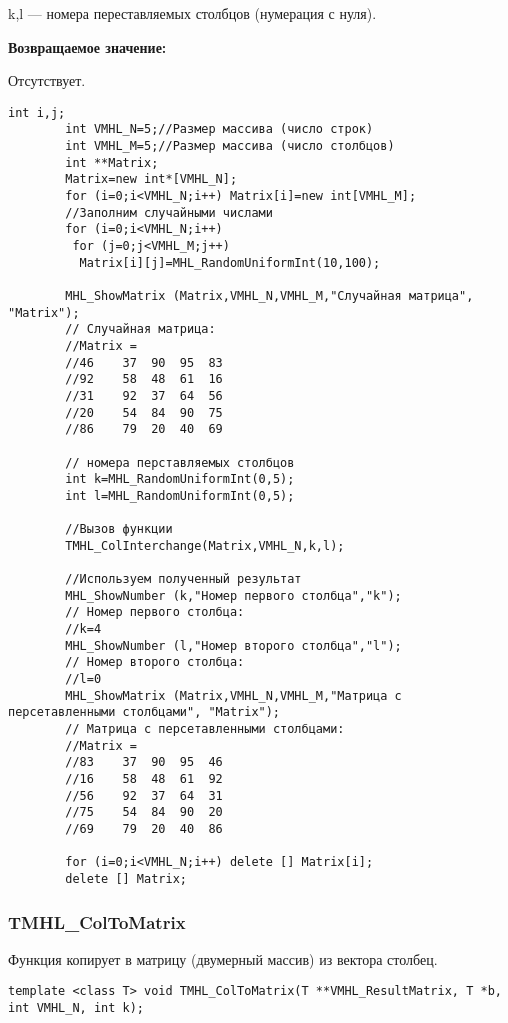 \documentclass[a4paper,12pt]{article}
\begin{document}
k,l --- номера переставляемых столбцов (нумерация с нуля).

\textbf{Возвращаемое значение:}

Отсутствует.


\begin{lstlisting}[label=code_use_TMHL_ColInterchange,caption=Пример использования]
        int i,j;
        int VMHL_N=5;//Размер массива (число строк)
        int VMHL_M=5;//Размер массива (число столбцов)
        int **Matrix;
        Matrix=new int*[VMHL_N];
        for (i=0;i<VMHL_N;i++) Matrix[i]=new int[VMHL_M];
        //Заполним случайными числами
        for (i=0;i<VMHL_N;i++)
         for (j=0;j<VMHL_M;j++)
          Matrix[i][j]=MHL_RandomUniformInt(10,100);

        MHL_ShowMatrix (Matrix,VMHL_N,VMHL_M,"Случайная матрица", "Matrix");
        // Случайная матрица:
        //Matrix =	
        //46	37	90	95	83
        //92	58	48	61	16
        //31	92	37	64	56
        //20	54	84	90	75
        //86	79	20	40	69

        // номера перставляемых столбцов
        int k=MHL_RandomUniformInt(0,5);
        int l=MHL_RandomUniformInt(0,5);

        //Вызов функции
        TMHL_ColInterchange(Matrix,VMHL_N,k,l);

        //Используем полученный результат
        MHL_ShowNumber (k,"Номер первого столбца","k");
        // Номер первого столбца:
        //k=4
        MHL_ShowNumber (l,"Номер второго столбца","l");
        // Номер второго столбца:
        //l=0
        MHL_ShowMatrix (Matrix,VMHL_N,VMHL_M,"Матрица с персетавленными столбцами", "Matrix");
        // Матрица с персетавленными столбцами:
        //Matrix =	
        //83	37	90	95	46
        //16	58	48	61	92
        //56	92	37	64	31
        //75	54	84	90	20
        //69	79	20	40	86

        for (i=0;i<VMHL_N;i++) delete [] Matrix[i];
        delete [] Matrix;
\end{lstlisting}

\subsubsection{TMHL\_ColToMatrix}\label{TMHL_ColToMatrix}

Функция копирует в матрицу (двумерный массив) из вектора столбец.


\begin{lstlisting}[label=code_syntax_TMHL_ColToMatrix,caption=Синтаксис]
template <class T> void TMHL_ColToMatrix(T **VMHL_ResultMatrix, T *b, int VMHL_N, int k);
\end{lstlisting}
\end{document}
